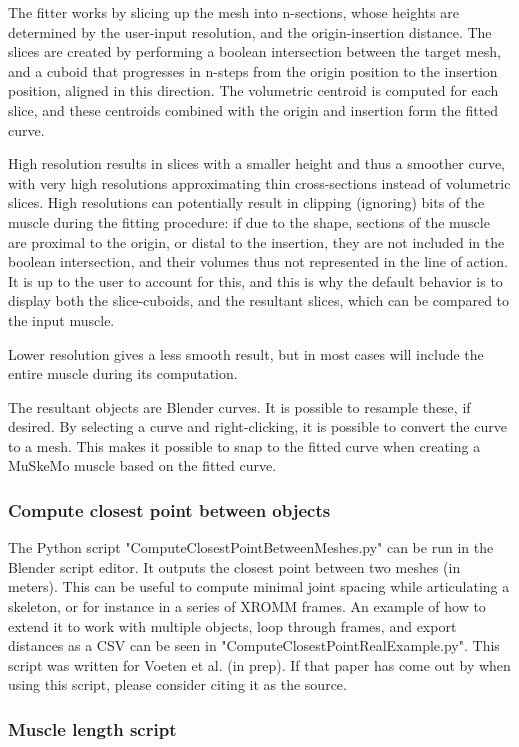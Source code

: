 \documentclass{article}
\begin{document}
The fitter works by slicing up the mesh into n-sections, whose heights are determined by the user-input resolution, and the origin-insertion distance. The slices are created by performing a boolean intersection between the target mesh, and a cuboid that progresses in n-steps from the origin position to the insertion position, aligned in this direction. The volumetric centroid is computed for each slice, and these centroids combined with the origin and insertion form the fitted curve. 

High resolution results in slices with a smaller height and thus a smoother curve, with very high resolutions approximating thin cross-sections instead of volumetric slices. High resolutions can potentially result in clipping (ignoring) bits of the muscle during the fitting procedure: if due to the shape, sections of the muscle are proximal to the origin, or distal to the insertion, they are not included in the boolean intersection, and their volumes thus not represented in the line of action. It is up to the user to account for this, and this is why the default behavior is to display both the slice-cuboids, and the resultant slices, which can be compared to the input muscle.

Lower resolution gives a less smooth result, but in most cases will include the entire muscle during its computation. 

The resultant objects are Blender curves. It is possible to resample these, if desired. By selecting a curve and right-clicking, it is possible to convert the curve to a mesh. This makes it possible to snap to the fitted curve when creating a MuSkeMo muscle based on the fitted curve.

\subsubsection{Compute closest point between objects}
The Python script "ComputeClosestPointBetweenMeshes.py" can be run in the Blender script editor. It outputs the closest point between two meshes (in meters). This can be useful to compute minimal joint spacing while articulating a skeleton, or for instance in a series of XROMM frames. An example of how to extend it to work with multiple objects, loop through frames, and export distances as a CSV can be seen in "ComputeClosestPointRealExample.py". This script was written for Voeten et al. (in prep). If that paper has come out by when using this script, please consider citing it as the source.

\subsubsection{Muscle length script}
\end{document}
